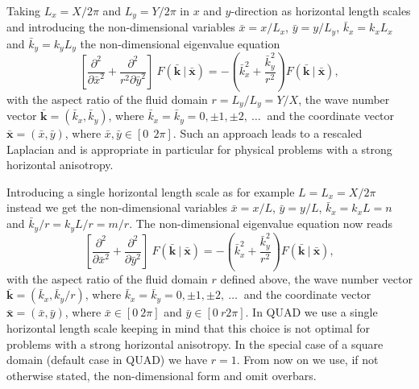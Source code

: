 Taking $L_{x} = X/2 \pi$ and $L_{y} = Y/ 2 \pi$ in $x$ and $y$-direction 
as horizontal length scales and introducing the non-dimensional variables
$\bar{x} = x/L_{x}$, $\bar{y} = y/L_{y}$, $\bar{k}_{x} = k_{x} L_{x}$ 
and $\bar{k}_{y} = k_{y} L_{y}$ the non-dimensional eigenvalue equation
\begin{equation} \label{eq_ndeigFkxkyLxLy}
 \left[ 
  \frac{\partial^{2}}{\partial \bar{x}^{2}} 
   +
  \frac{\partial^{2}}{r^{2} \partial \bar{y}^{2}} 
 \right] \ 
  F(\mathbf{\bar{k}} \ | \ \mathbf{\bar{x}})
   = 
  - \left( \bar{k}_{x}^{2} + \frac{\bar{k}_{y}^{2}}{r^{2}} \right)
  F(\mathbf{\bar{k}} \ | \ \mathbf{\bar{x}}),
\end{equation}
with the aspect ratio of the fluid domain $r = L_{y}/L_{y} = Y/X$,
the wave number vector $\mathbf{\bar{k}} = (\bar{k}_{x},\bar{k}_{y})$, 
where $\bar{k}_{x} = \bar{k}_{y} = 0, \pm 1, \pm 2, \ \dots \ $ and the
coordinate vector $\mathbf{\bar{x}} = (\bar{x},\bar{y})$, where 
$\bar{x},\bar{y} \in [0 \ \ 2\pi]$.
Such an approach leads to a rescaled Laplacian and is appropriate 
in particular for physical problems with a strong horizontal 
anisotropy.

Introducing a single horizontal length scale as for example 
$L = L_{x} = X/2 \pi$ instead we get the non-dimensional variables 
$\bar{x} = x/L$, $\bar{y} = y/L$, $\bar{k}_{x} = k_{x} L = n$ and 
$\bar{k}_{y}/r = k_{y} L/r = m/r$. The non-dimensional eigenvalue 
equation now reads
\begin{equation} \label{eq_ndeigFkxkyL}
 \left[ 
  \frac{\partial^{2}}{\partial \bar{x}^{2}} 
   +
  \frac{\partial^{2}}{\partial \bar{y}^{2}} 
 \right] \ 
  F(\mathbf{\bar{k}} \ | \ \mathbf{\bar{x}})
   = 
  - \left( \bar{k}_{x}^{2} + \frac{\bar{k}_{y}^{2}}{r^{2}} \right)
  F(\mathbf{\bar{k}} \ | \ \mathbf{\bar{x}}),
\end{equation}
with the aspect ratio of the fluid domain $r$ defined above, 
the wave number vector $\mathbf{\bar{k}} = (\bar{k}_{x},\bar{k}_{y}/r)$, 
where $\bar{k}_{x} = \bar{k}_{y} = 0, \pm 1, \pm 2, \ \dots \ $ and
the coordinate vector $\mathbf{\bar{x}} = (\bar{x},\bar{y})$, where
$\bar{x} \in [0 \ 2 \pi]$ and $\bar{y} \in [0 \ r 2 \pi]$. 
In QUAD we use a single horizontal length scale 
keeping in mind that this choice is not optimal for problems 
with a strong horizontal anisotropy. In the special case of a square domain 
(default case in QUAD) we have $r = 1$.
From now on we use, if not otherwise stated, the non-dimensional form and 
omit overbars. 

